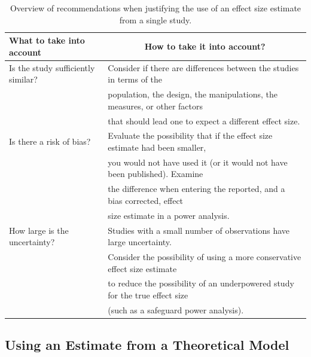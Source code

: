 \documentclass[
  english,
  ,jou,floatsintext]{apa6}
\begin{document}
\begin{table}[tbp]

\begin{center}
\begin{threeparttable}

\caption{\label{tab:table-es-just}Overview of recommendations when justifying the use of an effect size estimate from a single study.}

\begin{tabular}{ll}
\toprule
What to take into account & \multicolumn{1}{c}{How to take it into account?}\\
\midrule
Is the study sufficiently similar? & Consider if there are differences between the studies in terms of the\\
 & population, the design, the manipulations, the measures, or other factors\\
 & that should lead one to expect a different effect size.\\ \midrule
Is there a risk of bias? & Evaluate the possibility that if the effect size estimate had been smaller,\\
 & you would not have used it (or it would not have been published). Examine\\
 & the difference when entering the reported, and a bias corrected, effect\\
 & size estimate in a power analysis.\\ \midrule
How large is the uncertainty? & Studies with a small number of observations have large uncertainty.\\
 & Consider the possibility of using a more conservative effect size estimate\\
 & to reduce the possibility of an underpowered study for the true effect size\\
 & (such as a safeguard power analysis).\\
\bottomrule
\end{tabular}

\end{threeparttable}
\end{center}

\end{table}

\hypertarget{using-an-estimate-from-a-theoretical-model}{%
\subsection{Using an Estimate from a Theoretical Model}\label{using-an-estimate-from-a-theoretical-model}}
\end{document}
